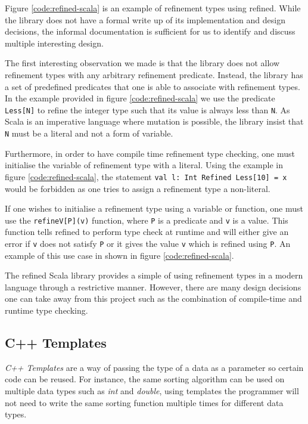 \documentclass[a4paper,12pt]{report}
\begin{document}
Figure \ref{code:refined-scala} is an example of refinement types using  
refined. While the library does not have a formal write up of its 
implementation and design decisions, the informal documentation is sufficient 
for us to identify and discuss multiple interesting design. 

\par
The first interesting observation we made is that the library does not allow 
refinement types with any arbitrary refinement predicate. Instead,  
the library has a set of predefined predicates that one is able to associate 
with refinement types. In the example provided in figure \ref{code:refined-scala} 
we use the predicate \verb|Less[N]| to refine the integer type such that its value 
is always less than \verb|N|. As Scala is an imperative language where mutation 
is possible, the library insist that \verb|N| must be a 
literal and not a form of variable.

\par
Furthermore, in order to have compile time refinement type checking, one must 
initialise the variable of refinement type with a literal. Using the example 
in figure \ref{code:refined-scala}, the statement 
\verb|val l: Int Refined Less[10] = x| would be forbidden as one tries to assign a 
refinement type a non-literal. 

\par
If one wishes to initialise a refinement type using a variable or function, one 
must use the \verb|refineV[P](v)| function, where \verb|P| is a predicate and 
\verb|v| is a value. This function tells refined to perform type check 
at runtime and will either give an error if \verb|v| does not 
satisfy \verb|P| or it gives the value \verb|v| which is refined using \verb|P|. 
An example of this use case in shown in figure \ref{code:refined-scala}.

\par
The refined Scala library provides a simple of using refinement types in a modern 
language through a restrictive manner. However, there are many design decisions 
one can take away from this project such as the combination of compile-time and 
runtime type checking. 

\subsection{C++ Templates} \label{section:cpp_templates}
\textit{C++ Templates} \cite{cppTemplate} are a way of passing the type of a 
data as a parameter so certain code can be reused. For instance, the same 
sorting algorithm can be used on multiple data types such as \textit{int} and 
\textit{double}, using templates the programmer will not need to write the same 
sorting function multiple times for different data types. 
\end{document}
